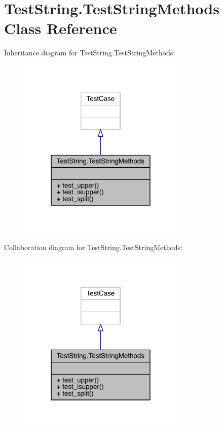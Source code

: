 \hypertarget{class_test_string_1_1_test_string_methods}{}\section{Test\+String.\+Test\+String\+Methods Class Reference}
\label{class_test_string_1_1_test_string_methods}


Inheritance diagram for Test\+String.\+Test\+String\+Methods\+:
\nopagebreak
\begin{figure}[H]
\begin{center}
\leavevmode
\includegraphics[width=226pt]{class_test_string_1_1_test_string_methods__inherit__graph}
\end{center}
\end{figure}


Collaboration diagram for Test\+String.\+Test\+String\+Methods\+:
\nopagebreak
\begin{figure}[H]
\begin{center}
\leavevmode
\includegraphics[width=226pt]{class_test_string_1_1_test_string_methods__coll__graph}
\end{center}
\end{figure}
